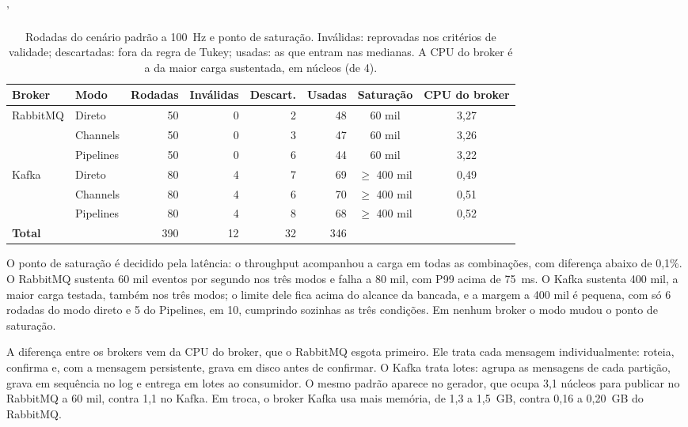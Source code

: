 '\documentclass[12pt]{article}
\begin{document}
\begin{table}[ht]
\centering
\caption{Rodadas do cenário padrão a 100~Hz e ponto de saturação. Inválidas: reprovadas
nos critérios de validade; descartadas: fora da regra de Tukey; usadas: as que entram nas
medianas. A CPU do broker é a da maior carga sustentada, em núcleos (de 4).}
\label{tab:validade}
\small
\setlength{\tabcolsep}{4.5pt}
\begin{tabular}{|l|l|r|r|r|r|c|c|}
\hline
\textbf{Broker} & \textbf{Modo} & \textbf{Rodadas} & \textbf{Inválidas} & \textbf{Descart.} & \textbf{Usadas} & \textbf{Saturação} & \textbf{CPU do broker} \\
\hline
\multirow{3}{*}{RabbitMQ} & Direto & 50 & 0 & 2 & 48 & 60 mil & 3,27 \\
 & Channels & 50 & 0 & 3 & 47 & 60 mil & 3,26 \\
 & Pipelines & 50 & 0 & 6 & 44 & 60 mil & 3,22 \\
\hline
\multirow{3}{*}{Kafka} & Direto & 80 & 4 & 7 & 69 & $\geq$ 400 mil & 0,49 \\
 & Channels & 80 & 4 & 6 & 70 & $\geq$ 400 mil & 0,51 \\
 & Pipelines & 80 & 4 & 8 & 68 & $\geq$ 400 mil & 0,52 \\
\hline
\multicolumn{2}{|l|}{\textbf{Total}} & 390 & 12 & 32 & 346 & & \\
\hline
\end{tabular}
\end{table}

O ponto de saturação é decidido pela latência: o throughput acompanhou a carga em todas
as combinações, com diferença abaixo de 0,1\%. O RabbitMQ sustenta 60 mil eventos por
segundo nos três modos e falha a 80 mil, com P99 acima de 75~ms. O Kafka sustenta 400 mil,
a maior carga testada, também nos três modos; o limite dele fica acima do alcance da
bancada, e a margem a 400 mil é pequena, com só 6 rodadas do modo direto e 5 do Pipelines,
em 10, cumprindo sozinhas as três condições. Em nenhum broker o modo mudou o ponto de
saturação.

A diferença entre os brokers vem da CPU do broker, que o RabbitMQ esgota primeiro. Ele
trata cada mensagem individualmente: roteia, confirma e, com a mensagem persistente, grava
em disco antes de confirmar. O Kafka trata lotes: agrupa as mensagens de cada partição,
grava em sequência no log e entrega em lotes ao consumidor. O mesmo padrão aparece no
gerador, que ocupa 3,1 núcleos para publicar no RabbitMQ a 60 mil, contra 1,1 no Kafka. Em
troca, o broker Kafka usa mais memória, de 1,3 a 1,5~GB, contra 0,16 a 0,20~GB do
RabbitMQ.
\end{document}
